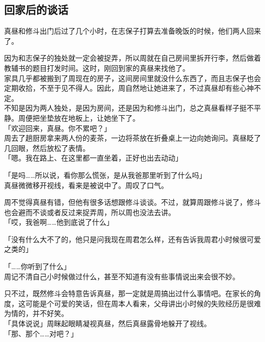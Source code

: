 \subsection{回家后的谈话}

真昼和修斗出门后过了几个小时，在志保子打算去准备晚饭的时候，他们两人回来了。

因为和志保子的独处就一定会被捉弄，所以周就在自己房间里拆开行李，然后做着教辅书的题目打发时间。这时，刚回到家的真昼来找他了。\\

家具几乎都被搬到了周现在的房子，这间房间里就没什么东西了，而且志保子也会定期收拾，不至于见不得人。因此，周自然地让她进来了，不过真昼却有些心神不定。\\

不知是因为两人独处，是因为房间，还是因为和修斗出门，总之真昼看样子挺不平静。周便把坐垫放在地板上，让她坐下了。\\

「欢迎回来，真昼。你不累吧？」\\

周去了趟厨房拿来两人份的麦茶，一边将茶放在折叠桌上一边向她询问。真昼眨了几回眼，然后放松了表情。\\

「嗯。我在路上、在这里都一直坐着，正好也出去动动」

「是吗……所以说，看你那么慌张，是从我爸那里听到了什么吗」\\

真昼微微移开视线，看来是被说中了。周叹了口气。

周不觉得真昼有错，但他有很多话想跟修斗谈谈。不过，就算周跟修斗说了，修斗也会避而不谈或者反过来捉弄周，所以周也没法去讲。\\

「哎，我爸啊……他到底说了什么」

「没有什么大不了的，他只是问我现在周君怎么样，还有告诉我周君小时候很可爱之类的」

「……你听到了什么」\\

周记不清自己小时候做过什么，甚至不知道有没有些事情说出来会很不妙。

只不过，既然修斗会特意告诉真昼，那一定就是周搞出过什么事情吧。在家长的角度，这可能是个可爱的笑话，但在周本人看来，父母讲出小时候的失败经历是很难为情的，并不好笑。\\

「具体说说」周眯起眼睛凝视真昼，然后真昼露骨地躲开了视线。\\

「那、那个……对吧？」

